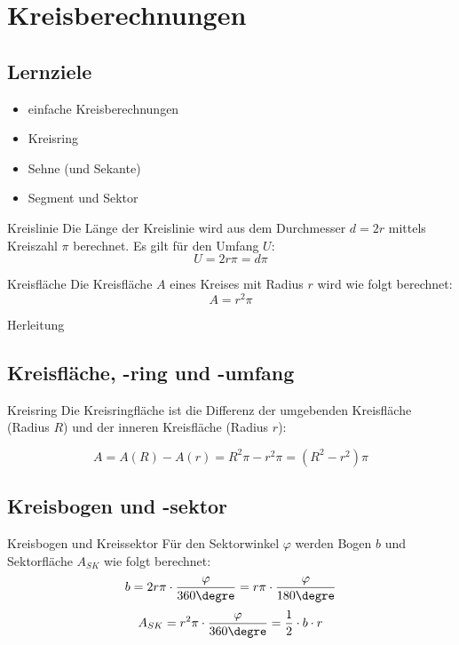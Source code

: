 
\section{Kreisberechnungen}


\subsection*{Lernziele}

\begin{itemize}
\item einfache Kreisberechnungen
\item Kreisring
\item Sehne (und Sekante)
\item Segment und Sektor
\end{itemize}



\begin{gesetz}{Kreislinie}{}\index{$\pi$}
  Die Länge der Kreislinie wird aus dem Durchmesser $d=2r$  mittels Kreiszahl
  $\pi$ berechnet. Es gilt für den Umfang $U$:
  $$U = 2r\pi = d\pi$$
\end{gesetz}

\begin{gesetz}{Kreisfläche}{}
  Die Kreisfläche $A$ eines Kreises mit Radius $r$ wird wie folgt
  berechnet:
  $$A = r^2\pi$$
\end{gesetz}
Herleitung

\subsection{Kreisfläche, -ring und -umfang}
\begin{gesetz}{Kreisring}{}
  Die Kreisringfläche ist die Differenz der umgebenden Kreisfläche
  (Radius $R$) und
  der inneren Kreisfläche (Radius $r$):

  $$A = A(R) - A(r) = R^2\pi - r^2\pi = (R^2-r^2)\pi$$
\end{gesetz}


\subsection{Kreisbogen und -sektor}
\begin{gesetz}{Kreisbogen und
    Kreissektor}{}
  Für den Sektorwinkel $\varphi$ werden Bogen $b$ und Sektorfläche
  $A_{SK}$ wie folgt berechnet:
  $$b = 2r\pi \cdot{}\frac{\varphi}{360\degre} =
  r\pi\cdot{}\frac{\varphi}{180\degre}$$
  $$A_{SK} = r^2\pi\cdot{}\frac{\varphi}{360\degre} = \frac12\cdot{}b\cdot{}r$$
  \end{gesetz}

